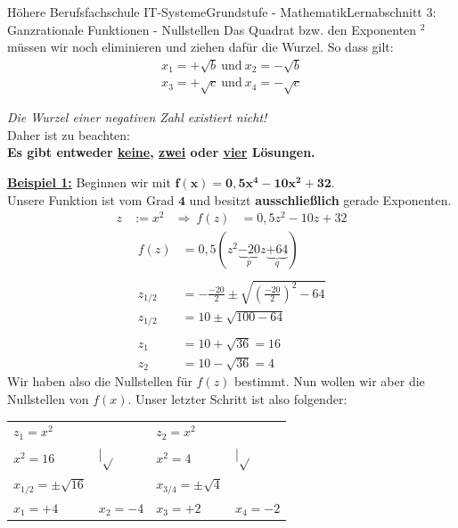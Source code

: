 \documentclass[11pt,twocolumn,oneside,openany,headings=optiontotoc,11pt,numbers=noenddot]{article}
\begin{document}
\begin{worksheet}{Höhere Berufsfachschule IT-Systeme}{Grundstufe - Mathematik}{Lernabschnitt 3: Ganzrationale Funktionen - Nullstellen}
		Das Quadrat bzw. den Exponenten \(^2\) müssen wir noch eliminieren und ziehen dafür die Wurzel. So dass gilt:
		\begin{align*}
			x_1 = +\sqrt{b}\ \text{und}\ x_2=-\sqrt{b}\\
			x_3 = +\sqrt{c}\ \text{und}\ x_4 = -\sqrt{c}
		\end{align*}
		\begin{framed}
			\noindent
			\small{\textit{Die Wurzel einer negativen Zahl existiert nicht!}}\normalsize\\
			Daher ist zu beachten:\\
			\textbf{Es gibt entweder \underline{keine}, \underline{zwei} oder \underline{vier} Lösungen.}
		\end{framed}
		\noindent
		\textbf{\underline{Beispiel 1:}} Beginnen wir mit \(\mathbf{f(x) = 0,5x^4-10x^2+32}\).\\
		Unsere Funktion ist vom Grad \(\mathbf{4}\) und besitzt \textbf{ausschließlich} gerade Exponenten.
		\begin{align*}
			z & := x^2 & \Rightarrow\ f(z) & = 0,5z^2 -10z +32
		\end{align*}
		\begin{align*}			
			f(z) & = 0,5(z^2 \underbrace{-20}_{p}z \underbrace{+64}_{q})\\
			\\
			z_{1/2} & = -\frac{-20}{2} \pm \sqrt{\left(\frac{-20}{2}\right)^2 - 64}\\
			z_{1/2} & = 10 \pm \sqrt{100 - 64}\\
			\\
			z_1 & = 10 + \sqrt{36} = 16\\
			z_2 & = 10 - \sqrt{36} = 4
		\end{align*}
		Wir haben also die Nullstellen für \(f(z)\) bestimmt. Nun wollen wir aber die Nullstellen von \(f(x)\). Unser letzter Schritt ist also folgender:\\
		\par\noindent
		\begin{tabularx}{0.48\textwidth}{Xl|Xl}
			\(z_1 = x^2\) & & \(z_2 = x^2\) &\\
			\(x^2 = 16\) & |\(\sqrt{}\) & \(x^2 = 4\) & |\(\sqrt{}\)\\
			\(x_{1/2} = \pm \sqrt{16}\) & & \(x_{3/4} = \pm \sqrt{4}\)\\
			\colorbox{green!10}{\(x_1 = +4\)} & \colorbox{green!10}{\(x_2 = -4\)} & \colorbox{green!10}{\(x_3 = +2\)} & \colorbox{green!10}{\(x_4 = -2\)}\\
		\end{tabularx}\\

\end{worksheet}
\end{document}
